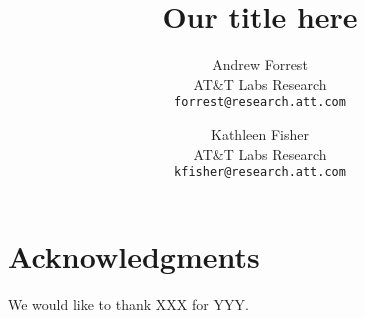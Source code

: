 \documentclass[12pt]{article}
\begin{document}
\title{Our title here}
\author{
Andrew Forrest \\ AT\&T Labs Research \\ \texttt{forrest@research.att.com}
\and
Kathleen Fisher \\ AT\&T Labs Research \\ \texttt{kfisher@research.att.com}
}



\maketitle{}








\section*{Acknowledgments}

We would like to thank XXX for YYY.



\end{document}
